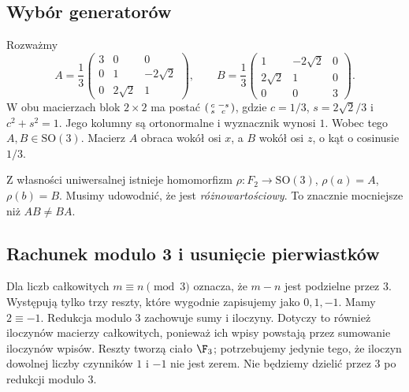 \subsection{Wybór generatorów}
Rozważmy
\begin{equation}\label{eq:5-1}
 A=\frac13\begin{pmatrix}3&0&0\\0&1&-2\sqrt2\\0&2\sqrt2&1\end{pmatrix},\qquad
 B=\frac13\begin{pmatrix}1&-2\sqrt2&0\\2\sqrt2&1&0\\0&0&3\end{pmatrix}.
\end{equation}
W obu macierzach blok $2\times2$ ma postać $\begin{psmallmatrix}c&-s\\s&c\end{psmallmatrix}$, gdzie $c=1/3$, $s=2\sqrt2/3$ i $c^2+s^2=1$. Jego kolumny są ortonormalne i wyznacznik wynosi $1$. Wobec tego $A,B\in\mathrm{SO}(3)$. Macierz $A$ obraca wokół osi $x$, a $B$ wokół osi $z$, o kąt o cosinusie $1/3$.

Z własności uniwersalnej istnieje homomorfizm $\rho:F_2\to\mathrm{SO}(3)$, $\rho(a)=A$, $\rho(b)=B$. Musimy udowodnić, że jest \emph{różnowartościowy}. To znacznie mocniejsze niż $AB\ne BA$.

\subsection{Rachunek modulo 3 i usunięcie pierwiastków}
Dla liczb całkowitych $m\equiv n\pmod3$ oznacza, że $m-n$ jest podzielne przez $3$. Występują tylko trzy reszty, które wygodnie zapisujemy jako $0,1,-1$. Mamy $2\equiv-1$. Redukcja modulo $3$ zachowuje sumy i iloczyny. Dotyczy to również iloczynów macierzy całkowitych, ponieważ ich wpisy powstają przez sumowanie iloczynów wpisów. Reszty tworzą ciało $\F_3$; potrzebujemy jedynie tego, że iloczyn dowolnej liczby czynników $1$ i $-1$ nie jest zerem. Nie będziemy dzielić przez $3$ po redukcji modulo $3$.

